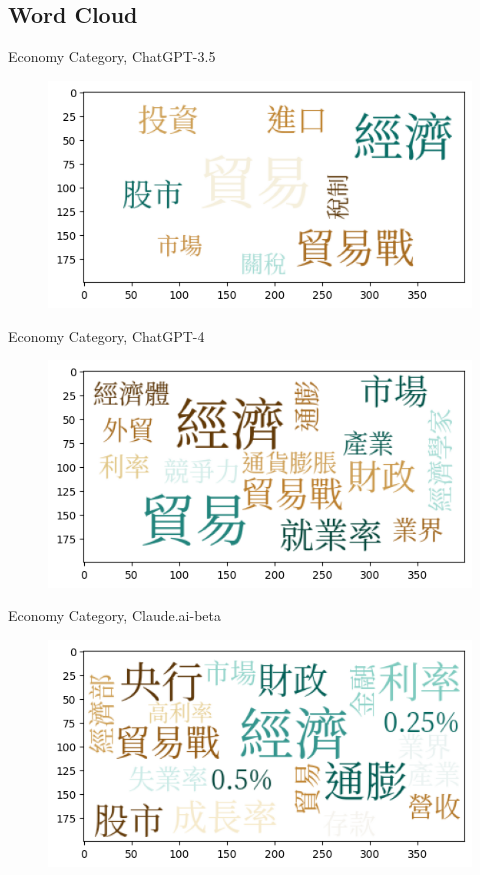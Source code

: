 \documentclass[12pt]{beamer}
\begin{document}
\subsection{Word Cloud}
\begin{frame}{Economy Category, ChatGPT-3.5}
\begin{figure}[H]
\centering
\includegraphics[width=11.5cm]{Figures/fig1.png}
\end{figure}
\end{frame}


\begin{frame}{Economy Category, ChatGPT-4}
\begin{figure}[H]
\centering
\includegraphics[width=11.5cm]{Figures/fig2.png}
\end{figure}
\end{frame}


\begin{frame}{Economy Category, Claude.ai-beta}
\begin{figure}[H]
\centering
\includegraphics[width=11.5cm]{Figures/fig3.png}
\end{figure}
\end{frame}
\end{document}
